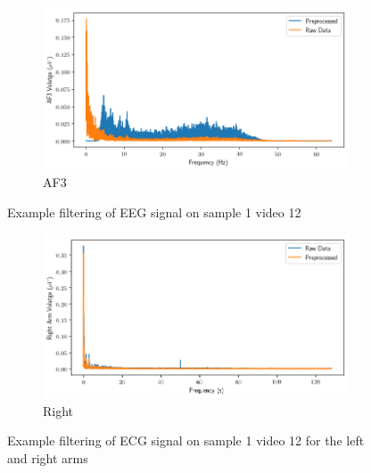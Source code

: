 \begin{figure}[b]
    \centering
    \begin{subfigure}[t]{\columnwidth}
        \centering
        \includegraphics[width=\columnwidth]{tex/figures/filtering/AF3.png}
        \caption{AF3}
        \label{fig:filter:af3}
    \end{subfigure}
    \caption{Example filtering of EEG signal on sample 1 video 12}
    \label{fig:eeg}
\end{figure}

\begin{figure}[h]
    \begin{subfigure}[t]{\columnwidth}
        \centering
        \includegraphics[width=\columnwidth]{tex/figures/filtering/ECG Right Arm.png}
        \caption{Right}
        \label{fig:filter:right}
    \end{subfigure}
    \caption{Example filtering of ECG signal on sample 1 video 12
             for the left and right arms}
    \label{fig:ecg}
\end{figure}

